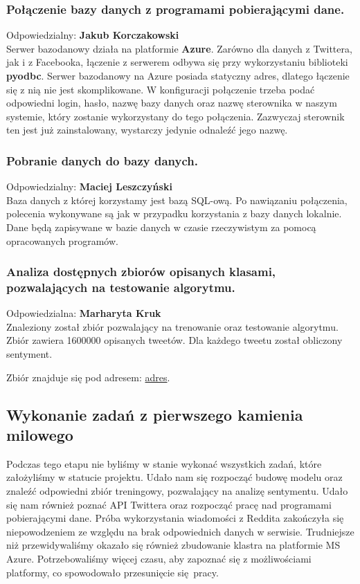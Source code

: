 \documentclass[a4paper,11pt, notitlepage ]{article}
\begin{document}
    \subsubsection{Połączenie bazy danych z programami pobierającymi dane.}
    Odpowiedzialny: \textbf{Jakub Korczakowski}\\
    Serwer bazodanowy działa na platformie \textbf{Azure}. Zarówno dla danych z Twittera, jak i z Facebooka, łączenie z serwerem odbywa się przy wykorzystaniu biblioteki \textbf{pyodbc}. Serwer bazodanowy na Azure posiada statyczny adres, dlatego łączenie się z nią nie jest skomplikowane. W konfiguracji połączenie trzeba podać odpowiedni login, hasło, nazwę bazy danych oraz nazwę sterownika w naszym systemie, który zostanie wykorzystany do tego połączenia. Zazwyczaj sterownik ten jest już zainstalowany, wystarczy jedynie odnaleźć jego nazwę.
    \subsubsection{Pobranie danych do bazy danych.}
    Odpowiedzialny: \textbf{Maciej Leszczyński}\\
    Baza danych z której korzystamy jest bazą SQL-ową. Po nawiązaniu połączenia, polecenia wykonywane są jak w przypadku korzystania z bazy danych lokalnie. Dane będą zapisywane w bazie danych w czasie rzeczywistym za pomocą opracowanych programów.
    \subsubsection{Analiza dostępnych zbiorów opisanych klasami, pozwalających na testowanie algorytmu.} 
    Odpowiedzialna: \textbf{Marharyta Kruk}\\
    Znaleziony został zbiór pozwalający na trenowanie oraz testowanie algorytmu. Zbiór zawiera 1600000 opisanych tweetów. Dla każdego tweetu został obliczony sentyment. 
    
    Zbiór znajduje się pod adresem: \href{https://www.kaggle.com/kazanova/sentiment140}{adres}.
    

\subsection{Wykonanie zadań z pierwszego kamienia milowego}
Podczas tego etapu nie byliśmy w stanie wykonać wszystkich zadań, które założyliśmy w statucie projektu. Udało nam się rozpocząć budowę modelu oraz znaleźć odpowiedni zbiór treningowy, pozwalający na analizę sentymentu. Udało się nam również poznać API Twittera oraz rozpocząć pracę nad programami pobierającymi dane. Próba wykorzystania wiadomości z Reddita zakończyła się niepowodzeniem ze względu na brak odpowiednich danych w serwisie. Trudniejsze niż przewidywaliśmy okazało się również zbudowanie klastra na platformie MS Azure. Potrzebowaliśmy więcej czasu, aby zapoznać się z możliwościami platformy, co spowodowało przesunięcie się pracy.
\end{document}
